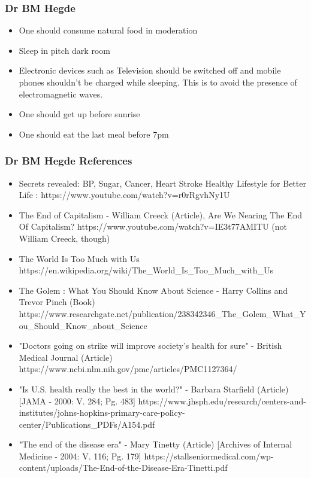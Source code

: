\begin{frame}[fragile]\frametitle{Dr BM Hegde}

	\begin{itemize}
	\item One should consume natural food in moderation 
	\item Sleep in pitch dark room 
	\item Electronic devices such as Television should be switched off and mobile phones shouldn’t be charged while sleeping. This is to avoid the presence of electromagnetic waves. 
	\item One should get up before sunrise 
	\item One should eat the last meal before 7pm
	\end{itemize}

\end{frame}

\begin{frame}[fragile]\frametitle{Dr BM Hegde References}
	\begin{itemize}
	\item Secrets revealed: BP, Sugar, Cancer, Heart Stroke Healthy Lifestyle for Better Life : https://www.youtube.com/watch?v=r0rRgvhNy1U 
	\item The End of Capitalism - William Creeck (Article), Are We Nearing The End Of Capitalism?  https://www.youtube.com/watch?v=IE3t77AMITU  (not William Creeck, though)
	\item The World Is Too Much with Us https://en.wikipedia.org/wiki/The\_World\_Is\_Too\_Much\_with\_Us   
	\item The Golem : What You Should Know About Science - Harry Collins and Trevor Pinch (Book) https://www.researchgate.net/publication/238342346\_The\_Golem\_What\_You\_Should\_Know\_about\_Science 
	\item "Doctors going on strike will improve society's health for sure" - British Medical Journal (Article) https://www.ncbi.nlm.nih.gov/pmc/articles/PMC1127364/ 
	\item "Is U.S. health really the best in the world?" - Barbara Starfield (Article) [JAMA - 2000: V. 284; Pg. 483] https://www.jhsph.edu/research/centers-and-institutes/johns-hopkins-primary-care-policy-center/Publications\_PDFs/A154.pdf 
	\item "The end of the disease era" - Mary Tinetty (Article) [Archives of Internal Medicine - 2004: V. 116; Pg. 179] https://stallseniormedical.com/wp-content/uploads/The-End-of-the-Disease-Era-Tinetti.pdf 
	\end{itemize}

\end{frame}

